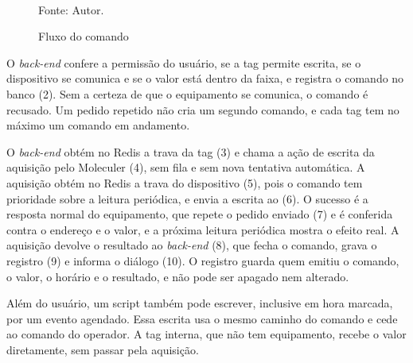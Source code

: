 \begin{figure}[H]
    \centering
    \caption{Fluxo do comando}
    \label{fig:fx_comando_execucao}
    \vspace{0.4cm}
    \vspace{0.2cm} \\
    Fonte: Autor.
\end{figure}

\par O \emph{back-end} confere a permissão do usuário, se a tag permite escrita, se o dispositivo se comunica e se o valor está dentro da faixa, e registra o comando no banco (2). Sem a certeza de que o equipamento se comunica, o comando é recusado. Um pedido repetido não cria um segundo comando, e cada tag tem no máximo um comando em andamento.

\par O \emph{back-end} obtém no Redis a trava da tag (3) e chama a ação de escrita da aquisição pelo Moleculer (4), sem fila e sem nova tentativa automática. A aquisição obtém no Redis a trava do dispositivo (5), pois o comando tem prioridade sobre a leitura periódica, e envia a escrita ao  (6). O sucesso é a resposta normal do equipamento, que repete o pedido enviado (7) e é conferida contra o endereço e o valor, e a próxima leitura periódica mostra o efeito real. A aquisição devolve o resultado ao \emph{back-end} (8), que fecha o comando, grava o registro (9) e informa o diálogo (10). O registro guarda quem emitiu o comando, o valor, o horário e o resultado, e não pode ser apagado nem alterado.

\par Além do usuário, um script também pode escrever, inclusive em hora marcada, por um evento agendado. Essa escrita usa o mesmo caminho do comando e cede ao comando do operador. A tag interna, que não tem equipamento, recebe o valor diretamente, sem passar pela aquisição.

